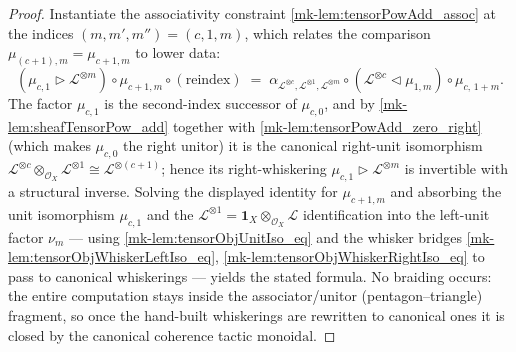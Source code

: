 \begin{proof}
  \leanok
  Instantiate the associativity constraint \ref{mk-lem:tensorPowAdd_assoc} at the
  indices \((m,m',m'') = (c,1,m)\), which relates the comparison
  \(\mu_{(c+1),m} = \mu_{c+1,m}\) to lower data:
  \[
    (\mu_{c,1} \rhd \mathcal{L}^{\otimes m}) \circ \mu_{c+1,m}
      \circ (\text{reindex})
    \;=\;
    \alpha_{\mathcal{L}^{\otimes c},\mathcal{L}^{\otimes 1},
        \mathcal{L}^{\otimes m}} \circ
      (\mathcal{L}^{\otimes c} \lhd \mu_{1,m}) \circ \mu_{c,\,1+m}.
  \]
  The factor \(\mu_{c,1}\) is the second-index successor of \(\mu_{c,0}\), and by
  \ref{mk-lem:sheafTensorPow_add} together with \ref{mk-lem:tensorPowAdd_zero_right}
  (which makes \(\mu_{c,0}\) the right unitor) it is the canonical right-unit
  isomorphism \(\mathcal{L}^{\otimes c}\otimes_{\mathcal{O}_X}\mathcal{L}^{
  \otimes 1}\cong\mathcal{L}^{\otimes(c+1)}\); hence its right-whiskering
  \(\mu_{c,1}\rhd\mathcal{L}^{\otimes m}\) is invertible with a structural
  inverse. Solving the displayed identity for \(\mu_{c+1,m}\) and absorbing the
  unit isomorphism \(\mu_{c,1}\) and the \(\mathcal{L}^{\otimes 1}=\mathbf{1}_X
  \otimes_{\mathcal{O}_X}\mathcal{L}\) identification into the left-unit factor
  \(\nu_m\) --- using \ref{mk-lem:tensorObjUnitIso_eq} and the whisker bridges
  \ref{mk-lem:tensorObjWhiskerLeftIso_eq}, \ref{mk-lem:tensorObjWhiskerRightIso_eq} to
  pass to canonical whiskerings --- yields the stated formula. No braiding occurs:
  the entire computation stays inside the associator/unitor (pentagon--triangle)
  fragment, so once the hand-built whiskerings are rewritten to canonical ones it
  is closed by the canonical coherence tactic \(\mathrm{monoidal}\).
\end{proof}

